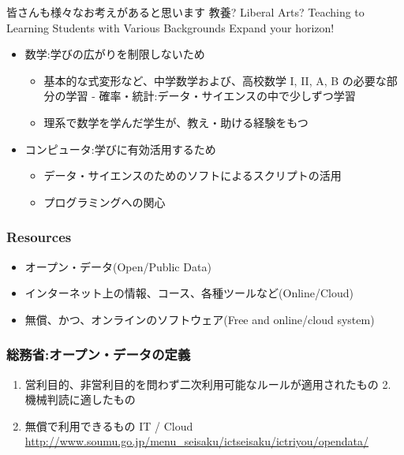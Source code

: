 \documentclass[
]{book}
\providecommand{\tightlist}{%
  \setlength{\itemsep}{0pt}\setlength{\parskip}{0pt}}
\theoremstyle{definition}
\theoremstyle{definition}
\theoremstyle{definition}
\theoremstyle{definition}
\theoremstyle{remark}
\begin{document}
皆さんも様々なお考えがあると思います
教養? Liberal Arts?
Teaching to Learning
Students with Various Backgrounds
Expand your horizon!

\begin{itemize}
\tightlist
\item
  数学:学びの広がりを制限しないため

  \begin{itemize}
  \tightlist
  \item
    基本的な式変形など、中学数学および、高校数学 I, II, A, B の必要な部分の学習 - 確率・統計:データ・サイエンスの中で少しずつ学習
  \item
    理系で数学を学んだ学生が、教え・助ける経験をもつ
  \end{itemize}
\item
  コンピュータ:学びに有効活用するため

  \begin{itemize}
  \tightlist
  \item
    データ・サイエンスのためのソフトによるスクリプトの活用
  \item
    プログラミングへの関心
  \end{itemize}
\end{itemize}

\hypertarget{resources}{%
\subsubsection{Resources}\label{resources}}

\begin{itemize}
\tightlist
\item
  オープン・データ(Open/Public Data)
\item
  インターネット上の情報、コース、各種ツールなど(Online/Cloud)
\item
  無償、かつ、オンラインのソフトウェア(Free and online/cloud system)
\end{itemize}

\hypertarget{ux7dcfux52d9ux7701ux30aaux30fcux30d7ux30f3ux30c7ux30fcux30bfux306eux5b9aux7fa9}{%
\subsubsection{総務省:オープン・データの定義}\label{ux7dcfux52d9ux7701ux30aaux30fcux30d7ux30f3ux30c7ux30fcux30bfux306eux5b9aux7fa9}}

\begin{enumerate}
\def\labelenumi{\arabic{enumi}.}
\tightlist
\item
  営利目的、非営利目的を問わず二次利用可能なルールが適用されたもの 2. 機械判読に適したもの
\item
  無償で利用できるもの
  IT / Cloud
  \url{http://www.soumu.go.jp/menu_seisaku/ictseisaku/ictriyou/opendata/}
\end{enumerate}
\end{document}
